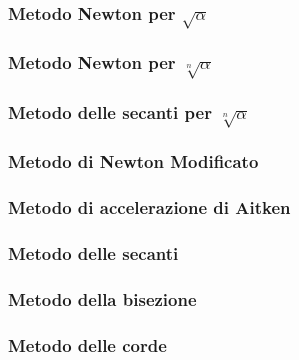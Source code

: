 \subsubsection{Metodo Newton per $\sqrt{\alpha}$}

\subsubsection{Metodo Newton per $\sqrt[n]{\alpha}$}

\subsubsection{Metodo delle secanti per $\sqrt[n]{\alpha}$}

\subsubsection{Metodo di Newton Modificato}

\subsubsection{Metodo di accelerazione di Aitken}

\subsubsection{Metodo delle secanti}

\subsubsection{Metodo della bisezione}

\subsubsection{Metodo delle corde}
